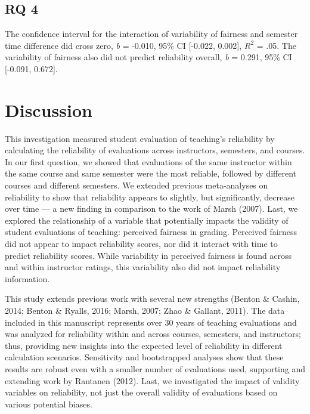 \documentclass[
  man]{apa7}
\begin{document}
\hypertarget{rq-4-1}{%
\subsection{RQ 4}\label{rq-4-1}}

The confidence interval for the interaction of variability of fairness
and semester time difference did cross zero, \emph{b} =
-0.010, 95\% CI
{[}-0.022,
0.002{]}, \(R^2\) =
.05.
The variability of fairness also did not predict reliability overall,
\emph{b} = 0.291, 95\% CI
{[}-0.091,
0.672{]}.

\hypertarget{discussion}{%
\section{Discussion}\label{discussion}}

This investigation measured student evaluation of teaching's reliability
by calculating the reliability of evaluations across instructors,
semesters, and courses. In our first question, we showed that
evaluations of the same instructor within the same course and same
semester were the most reliable, followed by different courses and
different semesters. We extended previous meta-analyses on reliability
to show that reliability appears to slightly, but significantly,
decrease over time --- a new finding in comparison to the work of
Marsh (2007). Last, we explored the relationship of a variable that
potentially impacts the validity of student evaluations of teaching:
perceived fairness in grading. Perceived fairness did not appear to
impact reliability scores, nor did it interact with time to predict
reliability scores. While variability in perceived fairness is found
across and within instructor ratings, this variability also did not
impact reliability information.

This study extends previous work with several new strengths (Benton \& Cashin, 2014; Benton \& Ryalls, 2016; Marsh, 2007; Zhao \& Gallant, 2011). The data included in this
manuscript represents over 30 years of teaching evaluations and was
analyzed for reliability within and across courses, semesters, and
instructors; thus, providing new insights into the expected level of
reliability in different calculation scenarios. Sensitivity and
bootstrapped analyses show that these results are robust even with a
smaller number of evaluations used, supporting and extending work by
Rantanen (2012). Last, we investigated the impact of validity variables on
reliability, not just the overall validity of evaluations based on
various potential biases.
\end{document}
